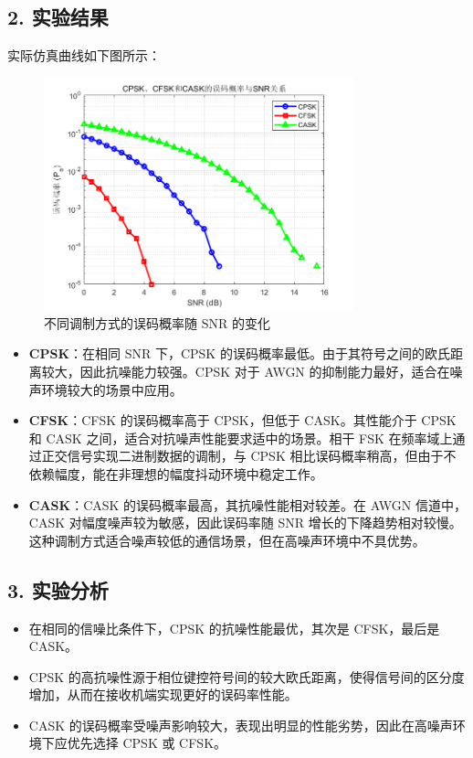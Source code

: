 \documentclass[12pt]{ctexart}
\begin{document}
\subsection*{2. 实验结果}
实际仿真曲线如下图所示：

\begin{figure}[H]
    \centering
    \includegraphics[width=0.8\textwidth]{image/output4-1.png}
    \caption{不同调制方式的误码概率随 SNR 的变化}
\end{figure}

\begin{itemize}
    \item \textbf{CPSK}：在相同 SNR 下，CPSK 的误码概率最低。由于其符号之间的欧氏距离较大，因此抗噪能力较强。CPSK 对于 AWGN 的抑制能力最好，适合在噪声环境较大的场景中应用。
    \item \textbf{CFSK}：CFSK 的误码概率高于 CPSK，但低于 CASK。其性能介于 CPSK 和 CASK 之间，适合对抗噪声性能要求适中的场景。相干 FSK 在频率域上通过正交信号实现二进制数据的调制，与 CPSK 相比误码概率稍高，但由于不依赖幅度，能在非理想的幅度抖动环境中稳定工作。
    \item \textbf{CASK}：CASK 的误码概率最高，其抗噪性能相对较差。在 AWGN 信道中，CASK 对幅度噪声较为敏感，因此误码率随 SNR 增长的下降趋势相对较慢。这种调制方式适合噪声较低的通信场景，但在高噪声环境中不具优势。
\end{itemize}

\subsection*{3. 实验分析}

\begin{itemize}
    \item 在相同的信噪比条件下，CPSK 的抗噪性能最优，其次是 CFSK，最后是 CASK。
    \item CPSK 的高抗噪性源于相位键控符号间的较大欧氏距离，使得信号间的区分度增加，从而在接收机端实现更好的误码率性能。
    \item CASK 的误码概率受噪声影响较大，表现出明显的性能劣势，因此在高噪声环境下应优先选择 CPSK 或 CFSK。
\end{itemize}
\end{document}
